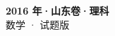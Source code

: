 \documentclass[zihao=-4, a4paper]{ctexart}
\begin{document}
\begin{center}
  {\Large\bfseries 2016 年·山东卷·理科}\\[4pt]
  {\large 数学 · 试题版}
\end{center}
\medskip
{}

\end{document}

